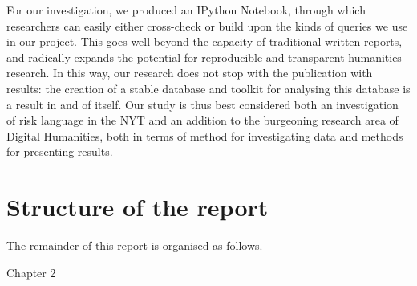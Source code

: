 For our investigation, we produced an IPython Notebook, through which researchers can easily either cross-check or build upon the kinds of queries we use in our project. This goes well beyond the capacity of traditional written reports, and radically expands the potential for reproducible and transparent humanities research. In this way, our research does not stop with the publication with results: the creation of a stable database and toolkit for analysing this database is a result in and of itself. Our study is thus best considered both an investigation of risk language in the NYT and an addition to the burgeoning research area of Digital Humanities, both in terms of method for investigating data and methods for presenting results.



\section{Structure of the report}

The remainder of this report is organised as follows.

Chapter 2 